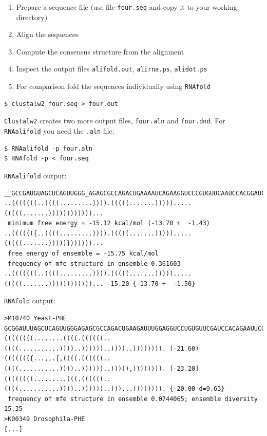 \documentclass[a4paper]{article}
\begin{document}
  \begin{enumerate}
  \item Prepare a sequence file (use file \texttt{four.seq} and copy it to your working directory)
  \item Align the sequences
  \item Compute the consensus structure from the alignment
  \item Inspect the output files \texttt{alifold.out}, \texttt{alirna.ps},
    \texttt{alidot.ps}
  \item For comparison fold the sequences individually using \texttt{RNAfold}
  \end{enumerate}
\begin{verbatim}
$ clustalw2 four.seq > four.out
\end{verbatim}
\vspace*{-5ex}
\texttt{Clustalw2} creates two more output files, \texttt{four.aln} and \texttt{four.dnd}. For \texttt{RNAalifold} you need the \texttt{.aln} file.
\begin{verbatim}
$ RNAalifold -p four.aln
$ RNAfold -p < four.seq
\end{verbatim}%
\vspace*{-3ex}
\texttt{RNAalifold} output:
\begin{scriptsize}
\begin{verbatim}
__GCCGAUGUAGCUCAGUUGGG_AGAGCGCCAGACUGAAAAUCAGAAGGUCCCGUGUUCAAUCCACGGAUCCGGCA__
..(((((((..((((.........)))).(((((.......))))).....(((((.......))))))))))))...
 minimum free energy = -15.12 kcal/mol (-13.70 +  -1.43)
..(((((({..((((.........)))).(((((.......))))).....(((((.......)))))}))))))...
 free energy of ensemble = -15.75 kcal/mol
 frequency of mfe structure in ensemble 0.361603
..(((((((..((((.........)))).(((((.......))))).....(((((.......))))))))))))... -15.20 {-13.70 +  -1.50}
\end{verbatim}
\end{scriptsize}
\texttt{RNAfold} output:
\begin{scriptsize}
\begin{verbatim}
>M10740 Yeast-PHE
GCGGAUUUAGCUCAGUUGGGAGAGCGCCAGACUGAAGAUUUGGAGGUCCUGUGUUCGAUCCACAGAAUUCGCA
((((((((........((((.((((((..((((...........))))..))))))..))))..)))))))). (-21.60)
((((((({...,,.{,((((.((((((..((((...........))))..))))))..))))),)))))))). [-23.20]
((((((((.........(((.((((((..((((...........))))..))))))..)))...)))))))). {-20.00 d=9.63}
 frequency of mfe structure in ensemble 0.0744065; ensemble diversity 15.35 
>K00349 Drosophila-PHE
[...]
\end{verbatim}
\end{scriptsize}
\end{document}
